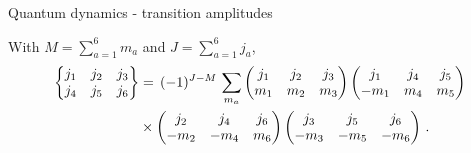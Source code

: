 \documentclass[12pt,titlepage]{article}
\begin{document}
\begin{frame}{Quantum dynamics - transition amplitudes}
\begin{list}{\,}{\leftmargin=1em \itemindent=0em}
        \item<3-> With $M=\sum_{a=1}^{6}m_a$ and $J=\sum_{a=1}^{6}j_a$,
        \vspace{-3pt}
        \begin{align}
            \begin{Bmatrix}
                j_1 & j_2 & j_3 \\
                j_4 & j_5 & j_6
            \end{Bmatrix}
            &=\,(-1)^{J-M}\,\sum_{m_a}
            \begin{pmatrix}
                j_1 & j_2 & j_3 \\
                m_1 & m_2 & m_3
            \end{pmatrix}
            \begin{pmatrix}
                j_1 & j_4 & j_5 \\
                -m_1 & m_4 & m_5
            \end{pmatrix}\notag\\
            &\times
            \begin{pmatrix}
                j_2 & j_4 & j_6 \\
                -m_2 & -m_4 & m_6
            \end{pmatrix}
            \begin{pmatrix}
                j_3 & j_5 & j_6 \\
                -m_3 & -m_5 & -m_6
            \end{pmatrix}\,.
        \end{align}
    \end{list}
\end{frame}
\end{document}
